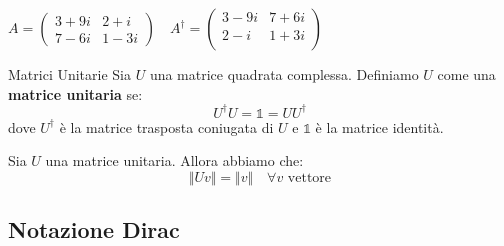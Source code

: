 \begin{example}{}{}
    $A = \left(\begin{array}{cc}
        3+9i & 2+i \\
        7-6i & 1-3i
    \end{array}\right) \quad A^{\dagger} = \left(\begin{array}       {cc}
        3-9i & 7+6i \\
        2-i & 1+3i \\
    \end{array}\right)$
\end{example}
\begin{definition}{Matrici Unitarie}{}\label{matUnit}
    Sia $U$ una matrice quadrata complessa. Definiamo $U$ come una \textbf{matrice unitaria} se:
    \begin{equation*}
        U^{\dagger}U = \mathbb{1} = UU^{\dagger}
    \end{equation*}
    dove $U^{\dagger}$ è la matrice trasposta coniugata di $U$ e $\mathbb{1}$ è la matrice identità.
\end{definition}
\begin{fact}{}{}
    Sia $U$ una matrice unitaria. Allora abbiamo che:
    \begin{equation*}
        \Vert Uv \Vert = \Vert v \Vert \quad \forall v \text{ vettore}
    \end{equation*}
\end{fact}
\subsection{Notazione Dirac}